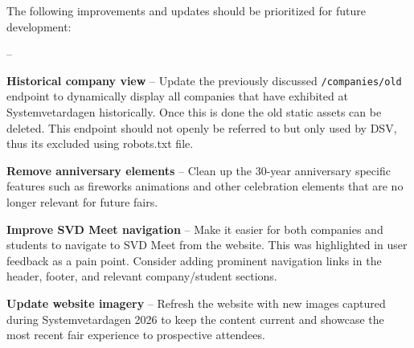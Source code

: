 \documentclass[a4paper,10pt,oneside]{article}
\begin{document}
The following improvements and updates should be prioritized for future development:

\begin{list}{--}{}
    \item \textbf{Historical company view} -- Update the previously discussed  \texttt{/companies/old} endpoint to dynamically display all companies that have exhibited at Systemvetardagen historically. Once this is done the old static assets can be deleted. This endpoint should not openly be referred to but only used by DSV, thus its excluded using robots.txt file.
    
    \item \textbf{Remove anniversary elements} -- Clean up the 30-year anniversary specific features such as fireworks animations and other celebration elements that are no longer relevant for future fairs.
    
    \item \textbf{Improve SVD Meet navigation} -- Make it easier for both companies and students to navigate to SVD Meet from the website. This was highlighted in user feedback as a pain point. Consider adding prominent navigation links in the header, footer, and relevant company/student sections.
    
    \item \textbf{Update website imagery} -- Refresh the website with new images captured during Systemvetardagen 2026 to keep the content current and showcase the most recent fair experience to prospective attendees.
\end{list}
\end{document}
